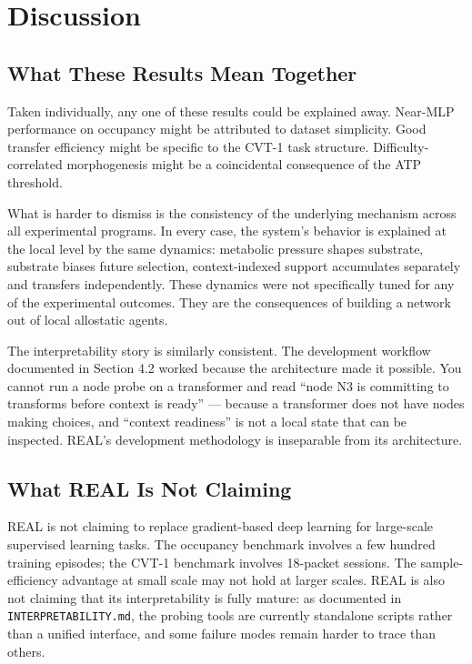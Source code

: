 \documentclass[letterpaper]{article}
\begin{document}
\section{Discussion}

\subsection{What These Results Mean Together}

Taken individually, any one of these results could be explained away. Near-MLP performance on occupancy might be attributed to dataset simplicity. Good transfer efficiency might be specific to the CVT-1 task structure. Difficulty-correlated morphogenesis might be a coincidental consequence of the ATP threshold.

What is harder to dismiss is the consistency of the underlying mechanism across all experimental programs. In every case, the system's behavior is explained at the local level by the same dynamics: metabolic pressure shapes substrate, substrate biases future selection, context-indexed support accumulates separately and transfers independently. These dynamics were not specifically tuned for any of the experimental outcomes. They are the consequences of building a network out of local allostatic agents.

The interpretability story is similarly consistent. The development workflow documented in Section 4.2 worked because the architecture made it possible. You cannot run a node probe on a transformer and read ``node N3 is committing to transforms before context is ready'' — because a transformer does not have nodes making choices, and ``context readiness'' is not a local state that can be inspected. REAL's development methodology is inseparable from its architecture.

\subsection{What REAL Is Not Claiming}

REAL is not claiming to replace gradient-based deep learning for large-scale supervised learning tasks. The occupancy benchmark involves a few hundred training episodes; the CVT-1 benchmark involves 18-packet sessions. The sample-efficiency advantage at small scale may not hold at larger scales. REAL is also not claiming that its interpretability is fully mature: as documented in \texttt{INTERPRETABILITY.md}, the probing tools are currently standalone scripts rather than a unified interface, and some failure modes remain harder to trace than others.
\end{document}
